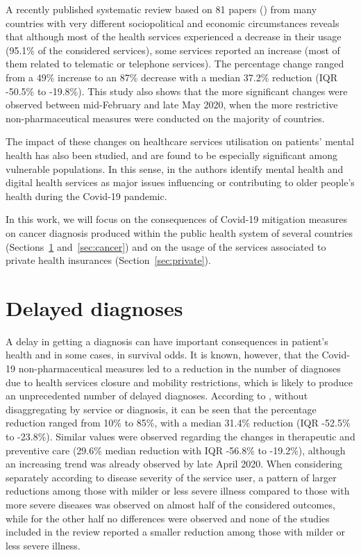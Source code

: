 \documentclass[main.tex]{subfiles}
\begin{document}
A recently published systematic review based on 81 papers (\cite{moynihan_impact_2021}) from many countries with very different sociopolitical and economic circumstances reveals that although most of the health services experienced a decrease in their usage (95.1\% of the considered services), some services reported an increase (most of them related to telematic or telephone services). The percentage change ranged from a 49\% increase to an 87\% decrease with a median 37.2\% reduction (IQR -50.5\% to -19.8\%). This study also shows that the more significant changes were observed between mid-February and late May 2020, when the more restrictive non-pharmaceutical measures were conducted on the majority of countries.

The impact of these changes on healthcare services utilisation on patients' mental health has also been studied, and are found to be especially significant among vulnerable populations. In this sense, in \cite{bastani_factors_2021} the authors identify mental health and digital health services as major issues influencing or contributing to older people’s health during the Covid-19 pandemic.

In this work, we will focus on the consequences of Covid-19 mitigation measures on cancer diagnosis produced within the public health system of several countries (Sections~\ref{sec:diagnoses} and~\ref{sec:cancer}) and on the usage of the services associated to private health insurances (Section~\ref{sec:private}). 

\section{Delayed diagnoses}\label{sec:diagnoses}
A delay in getting a diagnosis can have important consequences in patient's health and in some cases, in survival odds. It is known, however, that the Covid-19 non-pharmaceutical measures led to a reduction in the number of diagnoses due to health services closure and mobility restrictions, which is likely to produce an unprecedented number of delayed diagnoses. According to \cite{moynihan_impact_2021}, without disaggregating by service or diagnosis, it can be seen that the percentage reduction ranged from 10\% to 85\%, with a median 31.4\% reduction (IQR -52.5\% to -23.8\%). Similar values were observed regarding the changes in therapeutic and preventive care (29.6\% median reduction with IQR -56.8\% to -19.2\%), although an increasing trend was already observed by late April 2020. When considering separately according to disease severity of the service user, a pattern of larger reductions among those with milder or less severe illness compared to those with more severe diseases was observed on almost half of the considered outcomes, while for the other half no differences were observed and none of the studies included in the review reported a smaller reduction among those with milder or less severe illness.
\end{document}
